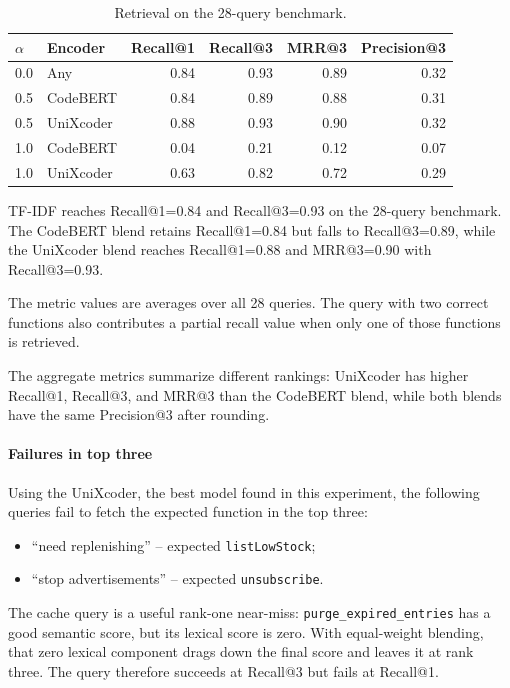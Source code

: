 \documentclass[12pt]{article}
\begin{document}
\begin{table}[htbp]
  \centering
  \small
  \setlength{\tabcolsep}{5pt}
  \begin{tabular}{llrrrr}
    \toprule
    \(\alpha\) & Encoder & Recall@1 & Recall@3 & MRR@3 & Precision@3 \\
    \midrule
    0.0 & Any       & 0.84 & 0.93 & 0.89 & 0.32 \\
    \midrule
    0.5 & CodeBERT  & 0.84 & 0.89 & 0.88 & 0.31 \\
    0.5 & UniXcoder & 0.88 & 0.93 & 0.90 & 0.32 \\
    \midrule
    1.0 & CodeBERT  & 0.04 & 0.21 & 0.12 & 0.07 \\
    1.0 & UniXcoder & 0.63 & 0.82 & 0.72 & 0.29 \\
    \bottomrule
  \end{tabular}
  \caption{Retrieval on the 28-query benchmark.}
  \label{tab:benchmark-results}
\end{table}

TF-IDF reaches Recall@1=0.84 and Recall@3=0.93 on the 28-query benchmark. The CodeBERT blend retains Recall@1=0.84
but falls to Recall@3=0.89, while the UniXcoder blend reaches Recall@1=0.88 and MRR@3=0.90 with Recall@3=0.93.

The metric values are averages over all 28 queries.
The query with two correct functions also contributes a partial recall value when only one of those functions is retrieved.

The aggregate metrics summarize different rankings: UniXcoder has higher Recall@1, Recall@3, and MRR@3 than the CodeBERT blend,
while both blends have the same Precision@3 after rounding.

\paragraph{Failures in top three}
Using the UniXcoder, the best model found in this experiment, the following queries fail to fetch the expected function in the top three:

\begin{itemize}
  \item ``need replenishing'' -- expected \texttt{listLowStock};
  \item ``stop advertisements'' -- expected \texttt{unsubscribe}.
\end{itemize}

The cache query is a useful rank-one near-miss: \texttt{purge\_expired\_entries} has a good semantic score, but its lexical
score is zero. With equal-weight blending, that zero lexical component drags down the final score and leaves it at rank
three. The query therefore succeeds at Recall@3 but fails at Recall@1.
\end{document}
